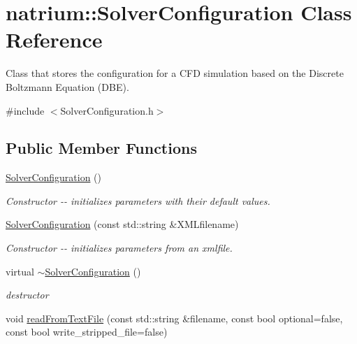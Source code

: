 \hypertarget{classnatrium_1_1SolverConfiguration}{
\section{natrium::SolverConfiguration Class Reference}
\label{classnatrium_1_1SolverConfiguration}
}


Class that stores the configuration for a CFD simulation based on the Discrete Boltzmann Equation (DBE).  


{\ttfamily \#include $<$SolverConfiguration.h$>$}\subsection*{Public Member Functions}
\begin{DoxyCompactItemize}
\item 
\hypertarget{classnatrium_1_1SolverConfiguration_a9aa7109e2eac9b8a7b424a35509ccdb0}{
\hyperlink{classnatrium_1_1SolverConfiguration_a9aa7109e2eac9b8a7b424a35509ccdb0}{SolverConfiguration} ()}
\label{classnatrium_1_1SolverConfiguration_a9aa7109e2eac9b8a7b424a35509ccdb0}

\begin{DoxyCompactList}\small\item\em Constructor -\/-\/ initializes parameters with their default values. \item\end{DoxyCompactList}\item 
\hyperlink{classnatrium_1_1SolverConfiguration_a062fa86eca607f830540ef4f2c06f0b3}{SolverConfiguration} (const std::string \&XMLfilename)
\begin{DoxyCompactList}\small\item\em Constructor -\/-\/ initializes parameters from an xmlfile. \item\end{DoxyCompactList}\item 
\hypertarget{classnatrium_1_1SolverConfiguration_ac1b521d8c205b8774dbb7c038304336d}{
virtual \hyperlink{classnatrium_1_1SolverConfiguration_ac1b521d8c205b8774dbb7c038304336d}{$\sim$SolverConfiguration} ()}
\label{classnatrium_1_1SolverConfiguration_ac1b521d8c205b8774dbb7c038304336d}

\begin{DoxyCompactList}\small\item\em destructor \item\end{DoxyCompactList}\item 
\hypertarget{classnatrium_1_1SolverConfiguration_a2900baca8d49d3a1d48926b8c8c39b71}{
void \hyperlink{classnatrium_1_1SolverConfiguration_a2900baca8d49d3a1d48926b8c8c39b71}{readFromTextFile} (const std::string \&filename, const bool optional=false, const bool write\_\-stripped\_\-file=false)}
\label{classnatrium_1_1SolverConfiguration_a2900baca8d49d3a1d48926b8c8c39b71}


\end{DoxyCompactItemize}
